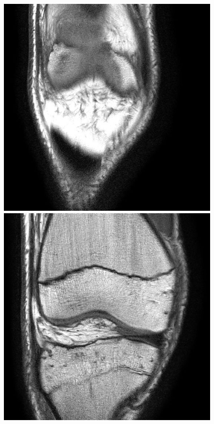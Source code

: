 \begin{figure}[H]
  \includegraphics[width=\linewidth]{imgs/3.jpg}
\endminipage\hfill
{}
  \includegraphics[width=\linewidth]{imgs/10.jpg}

\end{figure}
